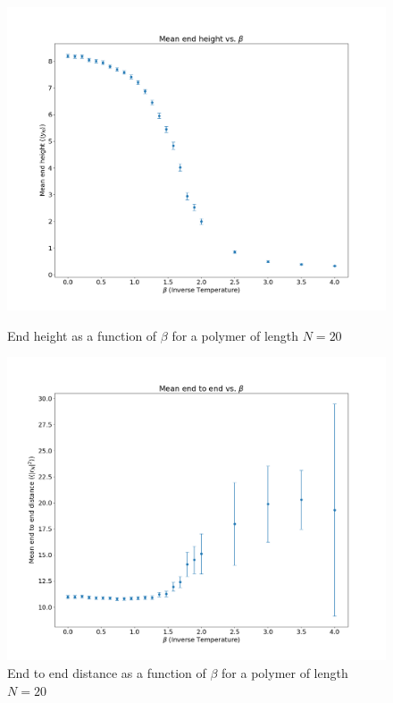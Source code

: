 \begin{figure}[h!]
    \centering
    \begin{minipage}[b]{0.45\textwidth} 
        \centering
        \includegraphics[width=\textwidth]{FIG/exercise_6_images/end_height_mmc.png}
        \caption{End height as a function of $\beta$ for a polymer of length $N = 20$}
        \label{end_height_mmc}
    \end{minipage}
    \hspace{0.05\textwidth} %
    \begin{minipage}[b]{0.45\textwidth}
        \centering
        \includegraphics[width=\textwidth]{FIG/exercise_6_images/endtoend_mmc.png}
        \caption{End to end distance as a function of $\beta$ for a polymer of length $N = 20$}
        \label{end_to end_mmc}
    \end{minipage}


\end{figure}
